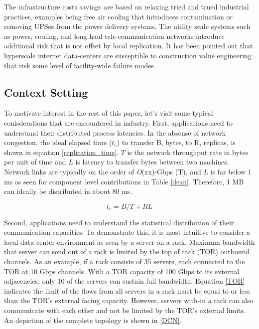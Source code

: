 \documentclass[conference]{IEEEtran}
\begin{document}
The infrastructure costs savings are based on relaxing tried and trued industrial practices, examples being free air cooling that introduces contamination or removing UPSes from the power delivery systems. The utility scale systems such as power, cooling, and long haul tele-communication networks introduce additional risk that is not offset by local replication. It has been pointed out that hyperscale internet data-centers are susceptible to construction value engineering that risk some level of facility-wide failure modes \cite{wsc}.

\subsection{Context Setting}

To motivate interest in the rest of this paper, let's visit some typical conisderations that are encountered in industry. First, applications need to understand their distributed process latencies. In the absense of network congestion, the ideal elapsed time ($t_e$) to transfer B, bytes, to R, replicas, is shown in equation \ref{replication_time}. $T$ is the network throughput rate in bytes per unit of time and $L$ is latency to transfer bytes between two machines\cite{GFS}. Network links are typically on the order of \textit{O}(xx)-Gbps (T), and $L$ is far below 1 ms as seen for component level contributions in Table \ref{dean}. Therefore, 1 MB can ideally be distributed in about 80 ms.

\begin{equation}
\label{replication_time}
t_e = B/T+RL
\end{equation}

Second, applications need to understand the statistical distribution of their communication capacities. To demonstrate this, it is most intuitive to consider a local data-center environment as seen by a server on a rack. Maximum bandwidth that server can send out of a rack is limited by the top of rack (TOR) outbound channels. As an example, if a rack consists of 35 servers, each connected to the TOR at 10 Gbps channels. With a TOR capacity of 100 Gbps to its external adjacencies, only 10 of the servers can sustain full bandwidth.  Equation \ref{TOR} indicates the limit of the flows from all servers in a rack must be equal to or less than the TOR's external facing capacity. However, servers with-in a rack can also communicate with each other and not be limited by the TOR's external limits. An depiction of the complete topology is shown in \ref{DCN}.
\end{document}
